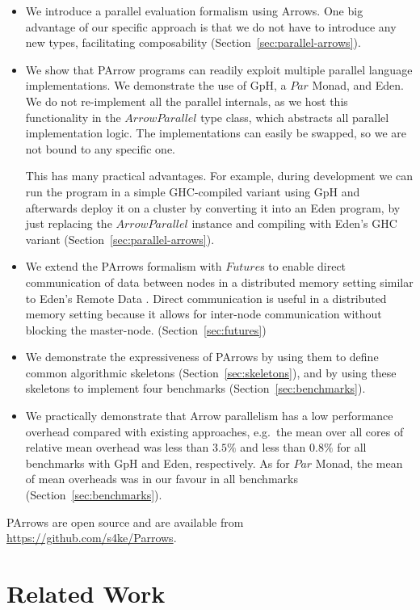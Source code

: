 \documentclass{jfp1}
\newcommand{\Conid}[1]{\mathit{#1}}
\DeclareRobustCommand{\hairspn}{\hspace{1pt}\nolinebreak}%
\DeclareRobustCommand{\eg}{{e.\hairspn{}g.~}}
\begin{document}
\begin{itemize}
\item We introduce a parallel evaluation formalism using Arrows. One big advantage of our specific approach is that we do not have to introduce any new types, facilitating composability (Section~\ref{sec:parallel-arrows}).
\item We show that PArrow programs can readily exploit multiple parallel language implementations. We demonstrate the use of GpH, a \ensuremath{\Conid{Par}} Monad, and Eden. We do not re-implement all the parallel internals, as we host this functionality in the \ensuremath{\Conid{ArrowParallel}} type class, which abstracts all parallel implementation logic. The implementations can easily be swapped, so we are not bound to any specific one.

This has many practical advantages. For example, during development we can run the program in a simple GHC-compiled variant using GpH and afterwards deploy it on a cluster by converting it into an Eden program, by just replacing the \ensuremath{\Conid{ArrowParallel}} instance and compiling with Eden's GHC variant (Section~\ref{sec:parallel-arrows}).
\item We extend the PArrows formalism with \ensuremath{\Conid{Future}}s to enable direct communication of data between nodes in a distributed memory setting similar to Eden's Remote Data \citep[\ensuremath{\Conid{RD}},][]{Dieterle2010}. Direct communication is useful in a distributed memory setting because it allows for inter-node communication without blocking the master-node. (Section~\ref{sec:futures})
\item We demonstrate the expressiveness of PArrows by using them to define common algorithmic skeletons (Section~\ref{sec:skeletons}), and by using these skeletons to implement four benchmarks (Section~\ref{sec:benchmarks}).
\item We practically demonstrate that Arrow parallelism has a low performance overhead compared with existing approaches, \eg the mean over all cores of relative mean overhead was less than $3.5\%$ and less than $0.8\%$ for all benchmarks with GpH and Eden, respectively. As for \ensuremath{\Conid{Par}} Monad, the mean of mean overheads was in our favour in all benchmarks (Section~\ref{sec:benchmarks}).
\end{itemize}

PArrows are open source and are available from \url{https://github.com/s4ke/Parrows}.
	\section{Related Work}
\label{sec:related-work}
\end{document}

